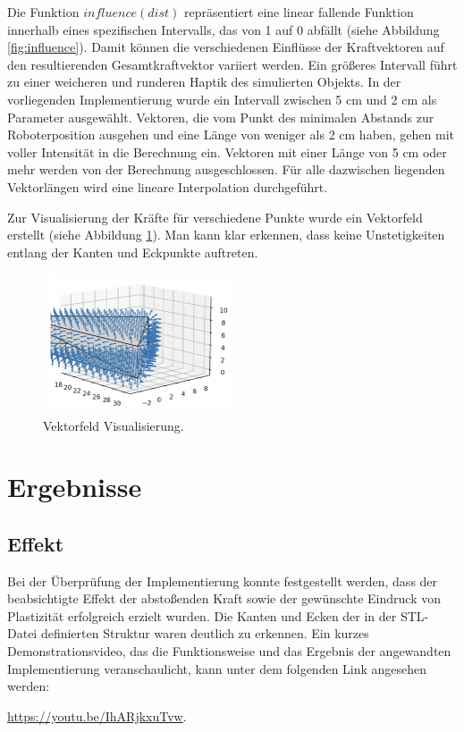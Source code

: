 \documentclass[conference]{IEEEtran}
\begin{document}
Die Funktion $influence(dist)$ repräsentiert eine linear fallende Funktion innerhalb eines spezifischen Intervalls, das von 1 auf 0 abfällt (siehe Abbildung \ref{fig:influence}). Damit können die verschiedenen Einflüsse der Kraftvektoren auf den resultierenden Gesamtkraftvektor variiert werden. Ein größeres Intervall führt zu einer weicheren und runderen Haptik des simulierten Objekts. In der vorliegenden Implementierung wurde ein Intervall zwischen 5 cm und 2 cm als Parameter ausgewählt. Vektoren, die vom Punkt des minimalen Abstands zur Roboterposition ausgehen und eine Länge von weniger als 2 cm haben, gehen mit voller Intensität in die Berechnung ein. Vektoren mit einer Länge von 5 cm oder mehr werden von der Berechnung ausgeschlossen. Für alle dazwischen liegenden Vektorlängen wird eine lineare Interpolation durchgeführt.

Zur Visualisierung der Kräfte für verschiedene Punkte wurde ein Vektorfeld erstellt (siehe Abbildung \ref{fig:vectorfield}). Man kann klar erkennen, dass keine Unstetigkeiten entlang der Kanten und Eckpunkte auftreten.
\begin{figure}[h]
    \centering
    \includegraphics[width=0.5\textwidth]{pics/vectorfield.png}
    \caption{Vektorfeld Visualisierung.}
    \label{fig:vectorfield}
\end{figure}
\section{Ergebnisse}
\subsection{Effekt}

Bei der Überprüfung der Implementierung konnte festgestellt werden, dass der beabsichtigte Effekt der abstoßenden Kraft sowie der gewünschte Eindruck von Plastizität erfolgreich erzielt wurden. Die Kanten und Ecken der in der STL-Datei definierten Struktur waren deutlich zu erkennen. Ein kurzes Demonstrationsvideo, das die Funktionsweise und das Ergebnis der angewandten Implementierung veranschaulicht, kann unter dem folgenden Link angesehen werden:
\begin{minipage}{\textwidth}
    \nobreak\url{https://youtu.be/IhARjkxuTvw}.
\end{minipage}
\end{document}

